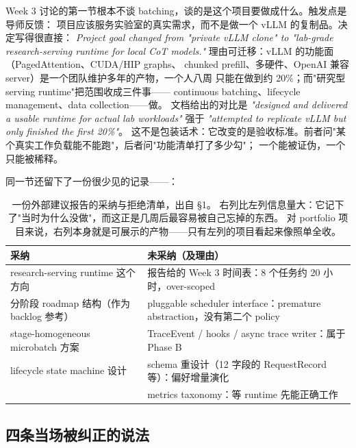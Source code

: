 Week 3 讨论的第一节根本不谈 batching，谈的是这个项目要做成什么。触发点是导师反馈：
项目应该服务实验室的真实需求，而不是做一个 vLLM 的复制品。决定写得很直接：
\emph{Project goal changed from "private vLLM clone" to "lab-grade research-serving runtime
for local CoT models."} 理由可迁移：vLLM 的功能面（PagedAttention、CUDA/HIP graphs、
chunked prefill、多硬件、OpenAI 兼容 server）是一个团队维护多年的产物，一个人八周
只能在做到约 20\%；而"研究型 serving runtime"把范围收成三件事——
continuous batching、lifecycle management、data collection——做。
文档给出的对比是 \emph{"designed and delivered a usable runtime for actual lab workloads"} 强于
\emph{"attempted to replicate vLLM but only finished the first 20\%"}。
这不是包装话术：它改变的是验收标准。前者问"某个真实工作负载能不能跑"，后者问"功能清单打了多少勾"；
一个能被证伪，一个只能被稀释。

同一节还留下了一份很少见的记录——：

\begin{table}[ht]
\centering
\begin{tabularx}{\textwidth}{@{}>{\raggedright\arraybackslash}X>{\raggedright\arraybackslash}X@{}}
\toprule
采纳 & 未采纳（及理由） \\
\midrule
research-serving runtime 这个方向 & 报告给的 Week 3 时间表：8 个任务约 20 小时，over-scoped \\
分阶段 roadmap 结构（作为 backlog 参考） & pluggable scheduler interface：premature abstraction，没有第二个 policy \\
stage-homogeneous microbatch 方案 & TraceEvent / hooks / async trace writer：属于 Phase B \\
lifecycle state machine 设计 & schema 重设计（12 字段的 RequestRecord 等）：偏好增量演化 \\
 & metrics taxonomy：等 runtime 先能正确工作 \\
\bottomrule
\end{tabularx}
\caption{一份外部建议报告的采纳与拒绝清单，出自  §1。
右列比左列信息量大：它记下了"当时为什么没做"，而这正是几周后最容易被自己忘掉的东西。
对 portfolio 项目来说，右列本身就是可展示的产物——只有左列的项目看起来像照单全收。}
\label{tab:cb-scope}
\end{table}

\subsection{四条当场被纠正的说法}
\label{sec:cb-misconceptions}

